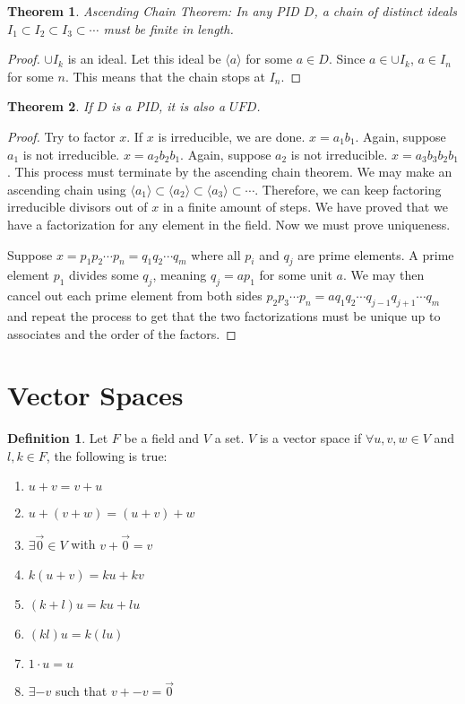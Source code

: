 \documentclass{article}
\theoremstyle{definition}
\newtheorem{definition}{Definition}
\theoremstyle{plain}
\newtheorem{theorem}{Theorem}
\theoremstyle{corollary}
\theoremstyle{lemma}
\begin{document}
\begin{theorem}
    Ascending Chain Theorem: In any PID $D$, a chain of distinct ideals $I_1\subset I_2\subset I_3\subset\cdots$ must be finite in length.
\end{theorem}

\begin{proof}
    $\cup I_k$ is an ideal. Let this ideal be $\langle a\rangle$ for some $a\in D$. Since $a\in\cup I_k$, $a\in I_n$ for some $n$. This means that the chain stops at $I_n$.
\end{proof}

\begin{theorem}
    If $D$ is a PID, it is also a $UFD$.
\end{theorem}

\begin{proof}
    Try to factor $x$. If $x$ is irreducible, we are done.
    $x=a_1b_1$. Again, suppose $a_1$ is not irreducible. $x=a_2b_2b_1$. Again, suppose $a_2$ is not irreducible. $x=a_3b_3b_2b_1$. This process must terminate by the ascending chain theorem. We may make an ascending chain using $\langle a_1\rangle\subset\langle a_2\rangle\subset\langle a_3\rangle\subset\cdots$. Therefore, we can keep factoring irreducible divisors out of $x$ in a finite amount of steps. We have proved that we have a factorization for any element in the field. Now we must prove uniqueness.

    Suppose $x=p_1p_2\cdots p_n=q_1q_2\cdots q_m$ where all $p_i$ and $q_j$ are prime elements. A prime element $p_1$ divides some $q_j$, meaning $q_j=ap_1$ for some unit $a$. We may then cancel out each prime element from both sides $p_2p_3\cdots p_n=aq_1q_2\cdots q_{j-1}q_{j+1}\cdots q_m$ and repeat the process to get that the two factorizations must be unique up to associates and the order of the factors.
\end{proof}

\section{Vector Spaces}

\begin{definition}
    Let $F$ be a field and $V$ a set. $V$ is a vector space if $\forall u,v,w\in V$ and $l,k\in F$, the following is true:
    \begin{enumerate}
        \item $u+v=v+u$
        \item $u+(v+w)=(u+v)+w$
        \item $\exists\vec0\in V$ with $v+\vec0=v$
        \item $k(u+v)=ku+kv$
        \item $(k+l)u=ku+lu$
        \item $(kl)u=k(lu)$
        \item $1\cdot u=u$
        \item $\exists-v$ such that $v+-v=\vec0$
    \end{enumerate}
\end{definition}
\end{document}
